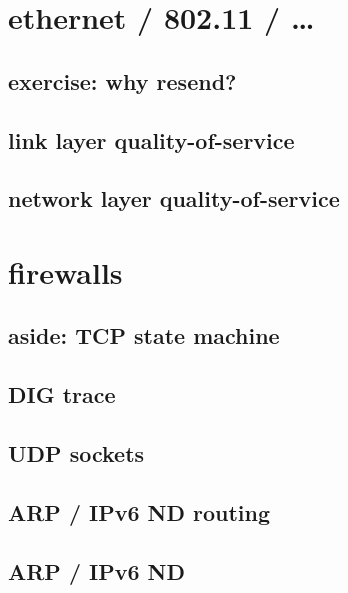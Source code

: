 
\section{ethernet / 802.11 / \ldots}


\subsection{exercise: why resend?}



\subsection{link layer quality-of-service}


\subsection{network layer quality-of-service}


\section{firewalls} %


\subsection{aside: TCP state machine}
\subsection{DIG trace}


\subsection{UDP sockets}


\subsection{ARP / IPv6 ND routing}


\subsection{ARP / IPv6 ND}


